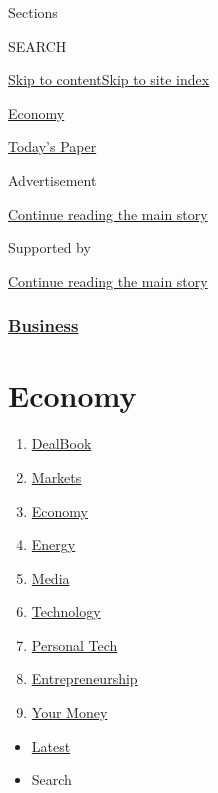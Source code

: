 Sections

SEARCH

\protect\hyperlink{site-content}{Skip to
content}\protect\hyperlink{site-index}{Skip to site index}

\href{https://www.nytimes.com/section/business/economy}{Economy}

\href{https://myaccount.nytimes.com/auth/login?response_type=cookie\&client_id=vi}{}

\href{https://www.nytimes.com/section/todayspaper}{Today's Paper}

Advertisement

\protect\hyperlink{after-top}{Continue reading the main story}

Supported by

\protect\hyperlink{after-sponsor}{Continue reading the main story}

\hypertarget{business}{%
\subsubsection{\texorpdfstring{\href{/section/business}{Business}}{Business}}\label{business}}

\hypertarget{economy}{%
\section{Economy}\label{economy}}

\begin{enumerate}
\def\labelenumi{\arabic{enumi}.}
\tightlist
\item
  \href{/pages/business/dealbook/index.html}{DealBook}
\item
  \href{https://markets.on.nytimes.com}{Markets}
\item
  \href{/section/business/economy}{Economy}
\item
  \href{/section/business/energy-environment}{Energy}
\item
  \href{/section/business/media}{Media}
\item
  \href{/section/technology}{Technology}
\item
  \href{/section/technology/personaltech}{Personal Tech}
\item
  \href{/section/business/smallbusiness}{Entrepreneurship}
\item
  \href{/section/your-money}{Your Money}
\end{enumerate}

\begin{itemize}
\tightlist
\item
  \protect\hyperlink{stream-panel}{Latest}
\item
  Search
\end{itemize}

